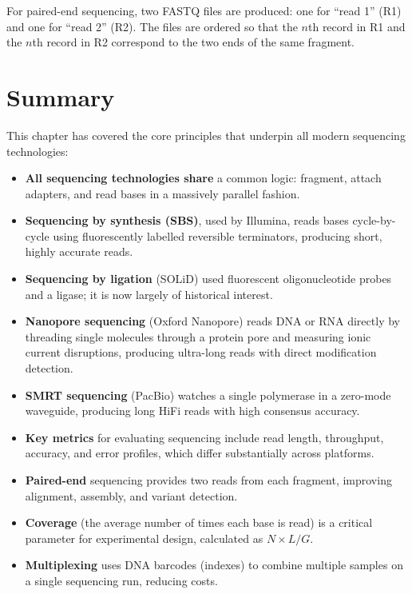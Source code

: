 For paired-end sequencing, two FASTQ files are produced: one for ``read 1'' (R1) and one for ``read 2'' (R2). The files are ordered so that the $n$th record in R1 and the $n$th record in R2 correspond to the two ends of the same fragment.


\section{Summary}
\label{sec:seqprinciples:summary}

This chapter has covered the core principles that underpin all modern sequencing technologies:

\begin{itemize}[itemsep=2pt]
  \item \textbf{All sequencing technologies share} a common logic: fragment, attach adapters, and read bases in a massively parallel fashion.
  \item \textbf{Sequencing by synthesis (SBS)}, used by Illumina, reads bases cycle-by-cycle using fluorescently labelled reversible terminators, producing short, highly accurate reads.
  \item \textbf{Sequencing by ligation} (SOLiD) used fluorescent oligonucleotide probes and a ligase; it is now largely of historical interest.
  \item \textbf{Nanopore sequencing} (Oxford Nanopore) reads DNA or RNA directly by threading single molecules through a protein pore and measuring ionic current disruptions, producing ultra-long reads with direct modification detection.
  \item \textbf{SMRT sequencing} (PacBio) watches a single polymerase in a zero-mode waveguide, producing long HiFi reads with high consensus accuracy.
  \item \textbf{Key metrics} for evaluating sequencing include read length, throughput, accuracy, and error profiles, which differ substantially across platforms.
  \item \textbf{Paired-end} sequencing provides two reads from each fragment, improving alignment, assembly, and variant detection.
  \item \textbf{Coverage} (the average number of times each base is read) is a critical parameter for experimental design, calculated as $N \times L / G$.
  \item \textbf{Multiplexing} uses DNA barcodes (indexes) to combine multiple samples on a single sequencing run, reducing costs.

\end{itemize}
